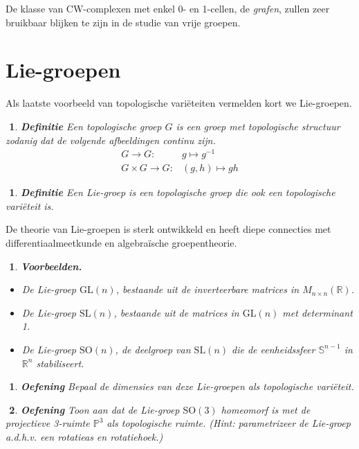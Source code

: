 \documentclass[12pt]{book}
\newcommand{\R}{\mathbb{R}}
\newtheorem{vbnh}[stelh]{$\!\!$}
\newenvironment{vbn}{\begin{vbnh} \em {\bf Voorbeelden.}}{\end{vbnh}}
\newtheorem{dfh}[stelh]{$\!\!$}
\newenvironment{df}{\begin{dfh} \em {\bf Definitie }}{\end{dfh}}
\newtheorem{eoef}{$\!\!$}[chapter]
\newenvironment{oef}{\begin{eoef} {\bf Oefening}}{\end{eoef}}
\begin{document}
De klasse van CW-complexen met enkel 0- en 1-cellen, de \emph{grafen}, zullen zeer bruikbaar blijken te zijn in de studie van vrije groepen. 

\section{Lie-groepen}

Als laatste voorbeeld van topologische vari\"eteiten vermelden kort we Lie-groepen. 

\begin{df}
Een \emph{topologische groep} $G$ is een groep met topologische structuur zodanig dat de volgende afbeeldingen continu zijn.
\begin{align*}
G \to G :& g \mapsto g^{-1} \\
G \times G  \to G :& (g,h) \mapsto gh
\end{align*}
\end{df}

\begin{df}
Een \emph{Lie-groep} is een topologische groep die ook een topologische vari\"eteit is.
\end{df}

De theorie van Lie-groepen is sterk ontwikkeld en heeft diepe connecties met differentiaalmeetkunde en algebra\"ische groepentheorie. 

\begin{vbn}
\begin{itemize}
\item De Lie-groep $\mathrm{GL}(n)$, bestaande uit de inverteerbare matrices in $M_{n \times n} (\R)$.
\item De Lie-groep $\mathrm{SL}(n)$, bestaande uit de matrices in $\mathrm{GL}(n)$ met determinant 1.
\item De Lie-groep $\mathrm{SO}(n)$, de deelgroep van $\mathrm{SL}(n)$ die de eenheidssfeer $\mathbb{S}^{n-1}$ in $\R^n$ stabiliseert.
\end{itemize}
\end{vbn}

\begin{oef}
Bepaal de dimensies van deze Lie-groepen als topologische vari\"eteit.
\end{oef}

\begin{oef}
Toon aan dat de Lie-groep $\mathrm{SO}(3)$ homeomorf is met de projectieve 3-ruimte $\mathbb{P}^3$ als topologische ruimte. (Hint: parametrizeer de Lie-groep a.d.h.v. een rotatieas en rotatiehoek.)
\end{oef}
\end{document}
